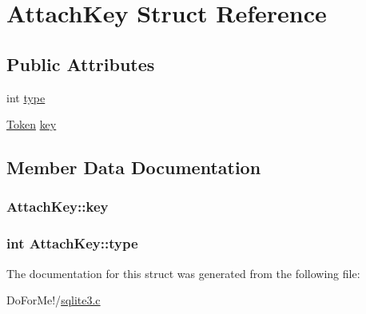 \hypertarget{struct_attach_key}{\section{Attach\-Key Struct Reference}
\label{struct_attach_key}
}
\subsection*{Public Attributes}
\begin{DoxyCompactItemize}
\item 
int \hyperlink{struct_attach_key_acd780bfae7415a79a90fa5ceb41515cd}{type}
\item 
\hyperlink{struct_token}{Token} \hyperlink{struct_attach_key_a267449f11a142a3b88c54aa01f842ad0}{key}
\end{DoxyCompactItemize}


\subsection{Member Data Documentation}
\hypertarget{struct_attach_key_a267449f11a142a3b88c54aa01f842ad0}{
\subsubsection[{key}]{ Attach\-Key\-::key}}\label{struct_attach_key_a267449f11a142a3b88c54aa01f842ad0}
\hypertarget{struct_attach_key_acd780bfae7415a79a90fa5ceb41515cd}{
\subsubsection[{type}]{\setlength{\rightskip}{0pt plus 5cm}int Attach\-Key\-::type}}\label{struct_attach_key_acd780bfae7415a79a90fa5ceb41515cd}


The documentation for this struct was generated from the following file\-:\begin{DoxyCompactItemize}
\item 
Do\-For\-Me!/\hyperlink{sqlite3_8c}{sqlite3.\-c}\end{DoxyCompactItemize}
